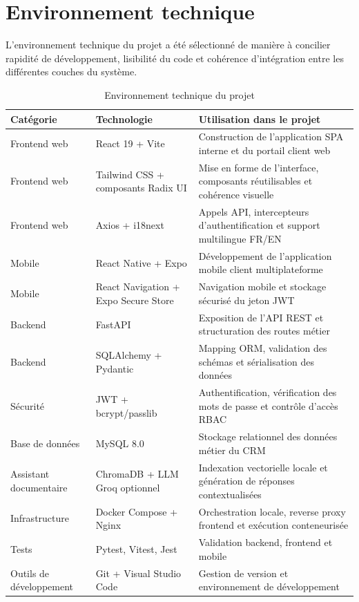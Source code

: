 \section{Environnement technique}
L'environnement technique du projet a été sélectionné de manière à concilier rapidité de développement, lisibilité du code et cohérence d'intégration entre les différentes couches du système.

\begin{table}[H]
\centering
\caption{Environnement technique du projet}
\label{tab:techno}
\begin{tabularx}{\textwidth}{|l|l|X|}
\hline
\textbf{Catégorie} & \textbf{Technologie} & \textbf{Utilisation dans le projet} \\
\hline
Frontend web & React 19 + Vite & Construction de l'application SPA interne et du portail client web \\
\hline
Frontend web & Tailwind CSS + composants Radix UI & Mise en forme de l'interface, composants réutilisables et cohérence visuelle \\
\hline
Frontend web & Axios + i18next & Appels API, intercepteurs d'authentification et support multilingue FR/EN \\
\hline
Mobile & React Native + Expo & Développement de l'application mobile client multiplateforme \\
\hline
Mobile & React Navigation + Expo Secure Store & Navigation mobile et stockage sécurisé du jeton JWT \\
\hline
Backend & FastAPI & Exposition de l'API REST et structuration des routes métier \\
\hline
Backend & SQLAlchemy + Pydantic & Mapping ORM, validation des schémas et sérialisation des données \\
\hline
Sécurité & JWT + bcrypt/passlib & Authentification, vérification des mots de passe et contrôle d'accès RBAC \\
\hline
Base de données & MySQL 8.0 & Stockage relationnel des données métier du CRM \\
\hline
Assistant documentaire & ChromaDB + LLM Groq optionnel & Indexation vectorielle locale et génération de réponses contextualisées \\
\hline
Infrastructure & Docker Compose + Nginx & Orchestration locale, reverse proxy frontend et exécution conteneurisée \\
\hline
Tests & Pytest, Vitest, Jest & Validation backend, frontend et mobile \\
\hline
Outils de développement & Git + Visual Studio Code & Gestion de version et environnement de développement \\
\hline
\end{tabularx}
\end{table}

